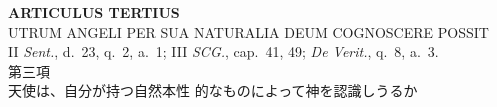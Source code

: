 \documentclass[paper=a4paper,fontsize=10pt,jafontsize=9pt,titlepage]{jlreq}
\begin{document}
\newpage
{}
{}
\setcounter{section}{3}
\setcounter{subsection}{0}



\begin{center}
{\Large {\bfseries ARTICULUS TERTIUS}}\\ {\large UTRUM ANGELI PER SUA
NATURALIA DEUM COGNOSCERE POSSIT}\\ {\footnotesize II {\itshape
Sent.}, d.~23, q.~2, a.~1; III {\itshape SCG.}, cap.~41, 49; {\itshape
De Verit.}, q.~8, a.~3.}\\ {\Large 第三項\\天使は、自分が持つ自然本性
的なものによって神を認識しうるか}
\end{center}
\end{document}
